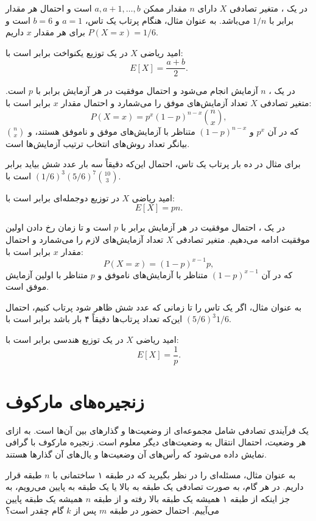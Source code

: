در یک ، متغیر تصادفی $X$ دارای $n$ مقدار ممکن $a,a+1,\ldots,b$ است و احتمال هر مقدار برابر با $1/n$ می‌باشد.
به عنوان مثال، هنگام پرتاب یک تاس، $a=1$ و $b=6$ است و برای هر مقدار $x$ داریم $P(X=x)=1/6$.

امید ریاضی $X$ در یک توزیع یکنواخت برابر است با:
\[E[X] = \frac{a+b}{2}.\]

در یک ، $n$ آزمایش انجام می‌شود و احتمال موفقیت در هر آزمایش برابر با $p$ است.
متغیر تصادفی $X$ تعداد آزمایش‌های موفق را می‌شمارد و احتمال مقدار $x$ برابر است با:
\[P(X=x)=p^x (1-p)^{n-x} {n \choose x},\]
که در آن $p^x$ و $(1-p)^{n-x}$ متناظر با آزمایش‌های موفق و ناموفق هستند، و ${n \choose x}$ بیانگر تعداد روش‌های انتخاب ترتیب آزمایش‌ها است.

برای مثال در ده بار پرتاب یک تاس، احتمال این‌که دقیقاً سه بار عدد شش بیاید برابر است با $(1/6)^3 (5/6)^7 {10 \choose 3}$.

امید ریاضی $X$ در توزیع دو‌جمله‌ای برابر است با:
\[E[X] = pn.\]

در یک ، احتمال موفقیت در هر آزمایش برابر با $p$ است و تا زمان رخ دادن اولین موفقیت ادامه می‌دهیم.
متغیر تصادفی $X$ تعداد آزمایش‌های لازم را می‌شمارد و احتمال مقدار $x$ برابر است با:
\[P(X=x)=(1-p)^{x-1} p,\]
که در آن $(1-p)^{x-1}$ متناظر با آزمایش‌های ناموفق و $p$ متناظر با اولین آزمایش موفق است.

به عنوان مثال، اگر یک تاس را تا زمانی که عدد شش ظاهر شود پرتاب کنیم، احتمال این‌که تعداد پرتاب‌ها دقیقاً ۴ بار باشد برابر است با $(5/6)^3 1/6$.

امید ریاضی $X$ در یک توزیع هندسی برابر است با:
\[E[X]=\frac{1}{p}.\]

\section{زنجیره‌های مارکوف}


یک 
فرآیندی تصادفی شامل مجموعه‌ای از وضعیت‌ها و گذارهای بین آن‌ها است.
به ازای هر وضعیت، احتمال انتقال به وضعیت‌های دیگر معلوم است.
زنجیره مارکوف با گرافی نمایش داده می‌شود
که رأس‌های آن وضعیت‌ها و یال‌های آن گذارها هستند.

به عنوان مثال، مسئله‌ای را در نظر بگیرید
که در طبقه ۱ ساختمانی با $n$ طبقه قرار داریم.
در هر گام، به صورت تصادفی یک طبقه به بالا
یا یک طبقه به پایین می‌رویم، به جز اینکه از طبقه ۱
همیشه یک طبقه بالا رفته و از طبقه $n$ همیشه یک طبقه پایین می‌آییم.
احتمال حضور در طبقه $m$ پس از $k$ گام چقدر است؟

